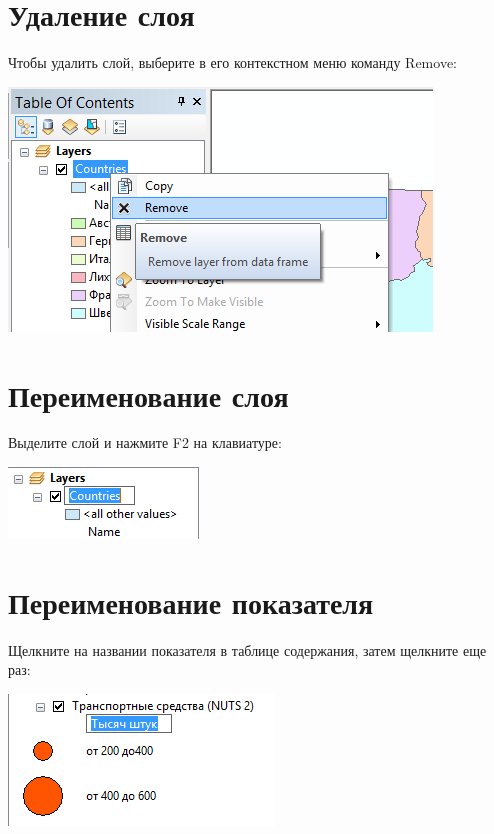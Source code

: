 \documentclass[12pt,]{book}
\begin{document}
\hypertarget{section-9}{%
\section{Удаление слоя}\label{section-9}}

Чтобы удалить слой, выберите в его контекстном меню команду Remove:

\includegraphics{images/Appendix/image7.png}

\hypertarget{section-10}{%
\section{Переименование слоя}\label{section-10}}

Выделите слой и нажмите F2 на клавиатуре:

\includegraphics{images/Appendix/image8.png}

\hypertarget{section-11}{%
\section{Переименование показателя}\label{section-11}}

Щелкните на названии показателя в таблице содержания, затем щелкните еще раз:

\includegraphics{images/Appendix/image9.png}
\end{document}
